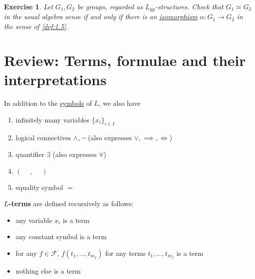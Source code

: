 \documentclass{article}
\newtheorem{nexercise}[nthm]{Exercise}
\newcommand{\named}[1]{\textbf{#1}\index{#1}}
\newcommand{\M}{\mathcal{M}}
\renewcommand{\N}{\mathcal{N}}
\begin{document}

\begin{nexercise}\label{ex:1.6}
  Let $G_1, G_2$ be groups, regarded as \hyperlink{def:lgp}{$L_{\text{gp}}$}-structures.
  Check that $G_1 \simeq G_2$ in the usual algebra sense if and only if there is an \hyperlink{def:iso}{isomorphism} $\alpha: G_1 \to G_2$ in the sense of \cref{def:1.5}.
\end{nexercise}

\clearpage
\section{Review: Terms, formulae and their interpretations}
In addition to the \hyperlink{def:lang}{symbols} of $L$, we also have
\begin{enumerate}[label=(\roman*)]
  \item infinitely many variables $\{x_i\}_{i \in I}$
  \item logical connectives $\wedge, \neg$ (also expresses $\vee, \implies, \iff$)
  \item quantifier $\exists$ (also expresses $\forall$)
  \item $(\phantom{-},\phantom{-})$
  \item equality symbol $=$
\end{enumerate}

\begin{ndef}\label{def:2.1}
  \textbf{$L$-terms} are defined recursively as follows:
  \begin{itemize}[label=--]
    \item any variable $x_i$ is a term
    \item any constant symbol is a term
    \item for any $f \in \mathscr{F}$, $f(t_1, \dotsc, t_{m_f})$ for any terms $t_1, \dotsc, t_{m_f}$ is a term
    \item nothing else is a term
  \end{itemize}
\end{ndef}
\end{document}
